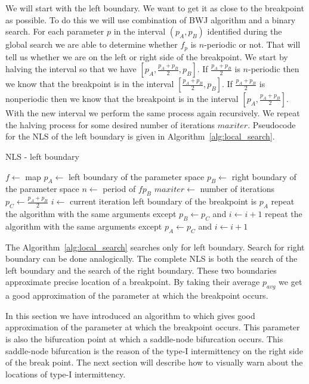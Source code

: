 \par
We will start with the left boundary. We want to get it as close to the breakpoint as possible.
To do this we will use combination of BWJ algorithm and a binary search.
For each parameter $p$ in the interval $(p_{A}, p_{B})$ identified during the global search we are able to determine whether $f_{p}$ is $n$-periodic or not.
That will tell us whether we are on the left or right side of the breakpoint.
We start by halving the interval so that we have $[p_{A}, \frac{p_{A}+p_{B}}{2}, p_{B}]$.
If $\frac{p_{A}+p_{B}}{2}$ is $n$-periodic then we know that the breakpoint is in the interval $[\frac{p_{A}+p_{B}}{2}, p_{B}]$.
If $\frac{p_{A}+p_{B}}{2}$ is nonperiodic then we know that the breakpoint is in the interval $[p_{A}, \frac{p_{A}+p_{B}}{2}]$.
With the new interval we perform the same process again recursively.
We repeat the halving process for some desired number of iterations $maxiter$.
Pseudocode for the NLS of the left boundary is given in Algorithm~\ref{alg:local_search}.

\begin{algorithm}[!h]
    \caption{NLS - left boundary}
    \label{alg:local_search}
    \begin{algorithmic}[1]
        \Statex $f \gets$ map
        \Statex $p_{A} \gets$ left boundary of the parameter space
        \Statex $p_{B} \gets$ right boundary of the parameter space
        \Statex $n \gets$ period of $f{p_{B}}$
        \Statex $maxiter \gets$ number of iterations
        \State $p_{C} \gets \frac{p_{A}+p_{B}}{2}$
        \State $i \gets$ current iteration
            \State left boundary of the breakpoint is $p_{A}$
        \EndIf
            \State repeat the algorithm with the same arguments except $p_{B} \gets p_{C}$ and $i \gets i+1$
        \Else
            \State repeat the algorithm with the same arguments except $p_{A} \gets p_{C}$ and $i \gets i+1$
        \EndIf
    \end{algorithmic}
\end{algorithm}

\par
The Algorithm~\ref{alg:local_search} searches only for left boundary. Search for right boundary can be done analogically.
The complete NLS is both the search of the left boundary and the search of the right boundary.
These two boundaries approximate precise location of a breakpoint.
By taking their average $p_{avg}$ we get a good approximation of the parameter at which the breakpoint occurs.
\par
In this section we have introduced an algorithm to which gives good approximation of the parameter at which the breakpoint occurs.
This parameter is also the bifurcation point at which a saddle-node bifurcation occurs.
This saddle-node bifurcation is the reason of the type-I intermittency on the right side of the break point.
The next section will describe how to visually warn about the locations of type-I intermittency.


